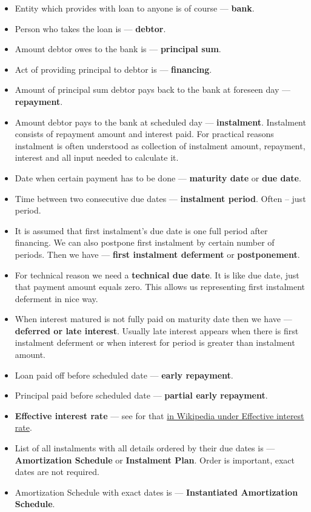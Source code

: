 \documentclass[letterpaper,11pt]{article}
\begin{document}
\begin{itemize}
\item Entity which provides with loan to anyone is of course --- {\bf bank}.    
\item Person who takes the loan is --- {\bf debtor}.
\item Amount debtor owes to the bank is --- {\bf principal sum}.
\item Act of providing principal to debtor is --- {\bf financing}.
\item Amount of principal sum debtor pays back to the bank at foreseen day --- {\bf repayment}.
\item Amount debtor pays to the bank at scheduled day --- {\bf instalment}. Instalment consists of repayment amount and interest paid. For practical reasons instalment is often understood as collection of instalment amount, repayment, interest and all input needed to calculate it.
\item Date when certain payment has to be done --- {\bf maturity date} or {\bf due date}.
\item Time between two consecutive due dates --- {\bf instalment period}. Often -- just period.
\item It is assumed that first instalment's due date is one full period after financing. We can also postpone first instalment by certain number of periods. Then we have --- {\bf first instalment deferment} or {\bf postponement}.
\item For technical reason we need a {\bf technical due date}. It is like due date, just that payment amount equals zero. This allows us representing first instalment deferment in nice way.
\item When interest matured is not fully paid on maturity date then we have --- {\bf deferred or late interest}. Usually late interest appears when there is first instalment deferment or when interest for period is greater than instalment amount.
\item Loan paid off before scheduled date --- {\bf early repayment}.
\item Principal paid before scheduled date --- {\bf partial early repayment}.
\item {\bf Effective interest rate} --- see for that \href{http://en.wikipedia.org/wiki/Effective_interest_rate}{in Wikipedia under Effective interest rate}.
\item List of all instalments with all details ordered by their due dates is --- {\bf Amortization Schedule} or {\bf Instalment Plan}. Order is important, exact dates are not required.
\item Amortization Schedule with exact dates is --- {\bf Instantiated Amortization Schedule}.
\end{itemize}
\end{document}
